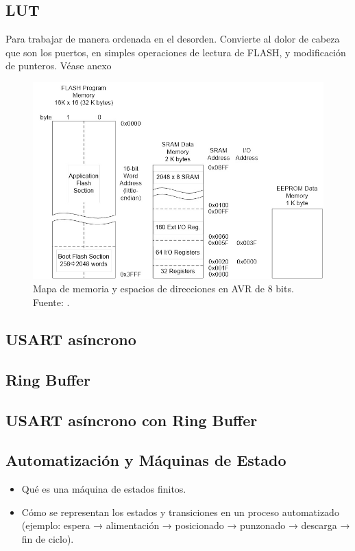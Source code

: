 \subsection{LUT}
Para trabajar de manera ordenada en el desorden. Convierte al dolor de cabeza que son los puertos, en simples operaciones de lectura de FLASH, y modificación de punteros. Véase anexo %



\begin{figure}[H]
  \centering
  \includegraphics[width=\linewidth]{./Anexos/Memory Map.jpg}
  \caption{Mapa de memoria y espacios de direcciones en AVR de 8 bits. Fuente: \cite{arxterra_avr_addressing_modes}.}
  \label{fig:avr-memory-map}
\end{figure}


\subsection{USART asíncrono}
\subsection{Ring Buffer}
\subsection{USART asíncrono con Ring Buffer}



\subsection{Automatización y Máquinas de Estado}
\begin{itemize}
    \item Qué es una máquina de estados finitos.
    \item Cómo se representan los estados y transiciones en un proceso automatizado (ejemplo: espera → alimentación → posicionado → punzonado → descarga → fin de ciclo).
\end{itemize}


